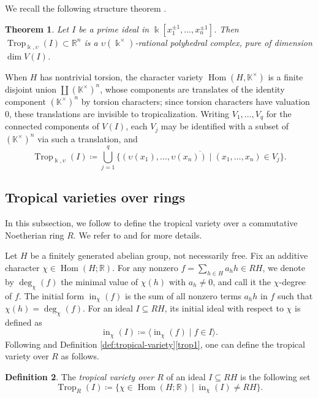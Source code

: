 \documentclass[11pt]{amsart}
\newtheorem{theorem}{Theorem}[section]
\theoremstyle{definition}
\newtheorem{definition}[theorem]{Definition}
\newcommand{\R}{\mathbb{R}}
\newcommand{\K}{\mathbb{K}}
\renewcommand{\k}{\Bbbk}
\DeclareMathOperator{\Hom}{{Hom}}
\DeclareMathOperator{\init}{in}
\DeclareMathOperator{\Trop}{Trop}
\begin{document}
We recall the following structure theorem \cite[Thm.~3.3.8]{MacStu}.

\begin{theorem}
\label{thm:structure-trop}
Let $I$ be a prime ideal in $\k[x_1^{{\pm 1}},\ldots,x_n^{{\pm 1}}]$.
Then $\Trop_{\k,\upsilon}(I)\subset \R^n$ is a 
$\upsilon(\k^{\times})$-rational polyhedral complex, 
pure of dimension $\dim V(I)$.
\end{theorem}

When $H$ has nontrivial torsion, the character variety 
$\Hom(H,\K^\times)$ is a finite disjoint union $\coprod(\K^{\times})^n$,
whose components are translates of the identity component 
$(\K^{\times})^n$ by torsion characters; since torsion characters 
have valuation $0$, these translations are invisible to 
tropicalization. Writing $V_1,\ldots,V_q$ for the connected 
components of $V(I)$, each $V_j$ may be identified with a 
subset of $(\K^{\times})^n$ via such a translation, and
\[
\Trop_{\k,\upsilon}(I) \coloneqq \bigcup_{j=1}^{q} 
\overline{\{(\upsilon(x_1),\ldots,\upsilon(x_n))\mid 
(x_1,\ldots,x_n)\in V_j\}}.
\]

\subsection{Tropical varieties over rings} 
\label{subsec:trop-over-ring}
In this subsection, we follow \cite[Sec.~1.6]{MacStu} to define 
the tropical variety over a commutative Noetherian ring $R$. 
We refer to \cite[Sec.~3]{LL} and \cite{BG} for more details.

Let $H$ be a finitely generated abelian group, not necessarily free. 
Fix an additive character $\chi \in \Hom(H ;\R)$. 
For any nonzero $f=\sum_{h\in H} a_h h \in R H$, we denote by $\deg_\chi(f)$ 
the minimal value of $\chi(h)$ with $a_h\neq 0$, and call it the $\chi$-degree of $f$. 
The initial form $\init_\chi(f)$ is the sum of all nonzero terms $a_h h$ in $f$ 
such that $\chi(h)=\deg_\chi(f)$. For an ideal $I \subseteq RH$, its initial ideal with 
respect to $\chi$ is defined as
\[
\init_\chi (I)\coloneqq \langle\init_\chi(f)\mid f\in I\rangle.
\]
Following \cite[Sec.~1.6]{MacStu} and Definition \ref{def:tropical-variety}\eqref{trop1}, 
one can define the tropical variety over $R$ as follows. 

\begin{definition}
\label{def:tropical-ring}
The {\it tropical variety over $R$} of an ideal $I\subseteq RH $ 
is the following set 
\[
\Trop_R(I)\coloneqq\{\chi \in \Hom(H ;\R) \mid 
\init_\chi (I)\neq R H \}.
\]
\end{definition}
\end{document}

